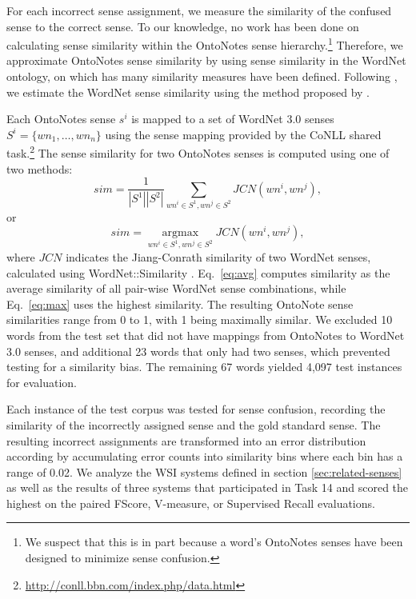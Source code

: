 \documentclass[11pt]{article}
\begin{document}
For each incorrect sense assignment, we measure the similarity of the confused
sense to the correct sense.  To our knowledge, no work has been done on
calculating sense similarity within the OntoNotes sense hierarchy.\footnote{We
  suspect that this is in part because a word's OntoNotes senses have been
  designed to minimize sense confusion.}  Therefore, we approximate OntoNotes
sense similarity by using sense similarity in the WordNet ontology, on which has
many similarity measures have been defined.  Following
, we estimate the WordNet sense similarity using
the method proposed by .


Each OntoNotes sense $s^i$ is mapped to a set of WordNet 3.0 senses $S^i =
\{wn_1, \ldots, wn_n\}$ using the sense mapping provided by the CoNLL shared
task.\footnote{\tiny\url{http://conll.bbn.com/index.php/data.html}} The sense
%
similarity for two OntoNotes senses is computed using one of two methods:
\begin{equation}
\label{eq:avg}
sim=\frac{1}{|S^1||S^2|}\sum_{wn^i \in S^1, wn^j \in S^2} JCN(wn^i, wn^j),
\end{equation}
\vspace{-1mm}
or
\vspace{-2mm}
\begin{equation}
\label{eq:max}
sim = \underset{wn^i \in S^1, wn^j \in S^2}{\operatorname{argmax}} JCN(wn^i, wn^j),
\end{equation}
where $JCN$ indicates the Jiang-Conrath similarity of two WordNet senses,
calculated using WordNet::Similarity \cite{pedersen04wordnet}.
Eq.\ \ref{eq:avg} computes similarity as the average similarity of all pair-wise
WordNet sense combinations, while Eq.\ \ref{eq:max} uses the highest similarity.
The resulting OntoNote sense similarities range from 0 to 1, with 1 being
maximally similar.
%
We excluded 10 words from the test set that did not have mappings from OntoNotes
to WordNet 3.0 senses, and additional 23 words that only had two senses,
which prevented testing for a similarity bias.  The remaining 67 words
yielded 4,097 test instances for evaluation.

Each instance of the test corpus was tested for
sense confusion, recording the similarity of the incorrectly assigned sense and
the gold standard sense.  The resulting incorrect assignments are transformed
into an error distribution according by accumulating error counts into
similarity bins where each bin has a range of 0.02.  We analyze the WSI systems
defined in section \ref{sec:related-senses} as well as the results of three
systems that participated in Task 14 and scored the highest on the paired
FScore, V-measure, or Supervised Recall evaluations.
\end{document}
